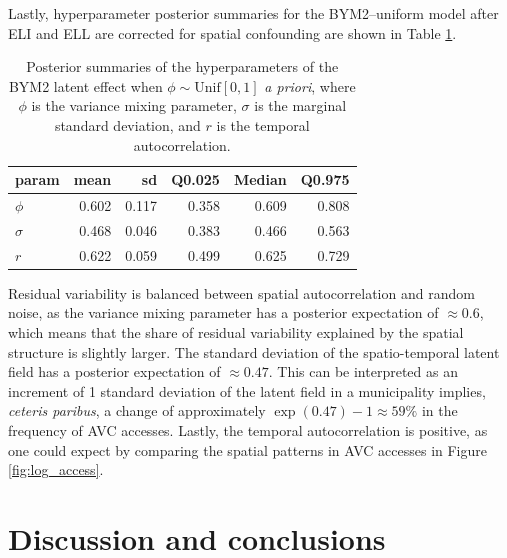 \documentclass[openany, 11pt, oneside]{book}
\begin{document}
 Lastly, hyperparameter posterior summaries for the BYM2--uniform model after ELI and ELL are corrected for spatial confounding are shown in Table \ref{tab:hyperpar_VAW}.
%
\begin{table}[ht]
\centering
\begin{tabular}{lrrrrr}
  \hline
param & mean & sd & Q0.025 & Median & Q0.975 \\ 
  \hline
  $\phi$ & 0.602 & 0.117 & 0.358 & 0.609 & 0.808 \\ 
  $\sigma$ & 0.468 & 0.046 & 0.383 & 0.466 & 0.563 \\ 
  $r$ & 0.622 & 0.059 & 0.499 & 0.625 & 0.729 \\ 
   \hline
\end{tabular}
\captionsetup{width=0.9\textwidth}
\caption{Posterior summaries of the hyperparameters of the BYM2 latent effect when $\phi \sim \mathrm{Unif}[0,1]$ \textit{a priori}, where $\phi$ is the variance mixing parameter, $\sigma$ is the marginal standard deviation, and $r$ is the temporal autocorrelation.}
\label{tab:hyperpar_VAW}
\end{table}
%
Residual variability is balanced between spatial autocorrelation and random noise, as the variance mixing parameter has a posterior expectation of $\approx 0.6$, which means that the share of residual variability explained by the spatial structure is slightly larger. The standard deviation of the spatio-temporal latent field has a posterior expectation of $\approx 0.47$. This can be interpreted as an increment of 1 standard deviation of the latent field in a municipality implies, \textit{ceteris paribus}, a change of approximately $\exp(0.47)-1\approx59\%$ in the frequency of AVC accesses. Lastly, the temporal autocorrelation is positive, as one could expect by comparing the spatial patterns in AVC accesses in Figure \ref{fig:log_access}.


\section{Discussion and conclusions}\label{section:VAW.discussion}
\end{document}
